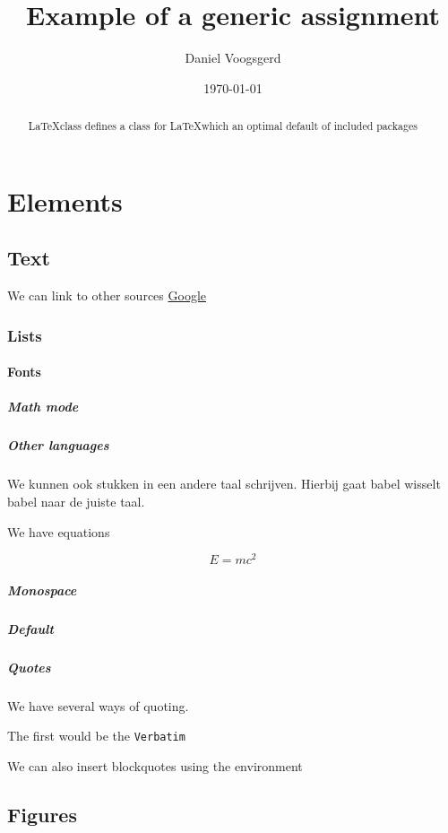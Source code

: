 \documentclass{uniarticle}
\title{Example of a generic assignment}
\date{\today}
\author{Daniel Voogsgerd}
\begin{document}
\maketitle

\tableofcontents

\begin{abstract}
    \LaTeX class defines a class for \LaTeX which an optimal default of
    included packages
\end{abstract}

\section{Elements}

\subsection{Text}

We can link to other sources \href{https://google.com}{Google}

\subsubsection{Lists}

\paragraph{Fonts}

\subparagraph{Math mode}

\subparagraph{Other languages}

\foreignlanguage{dutch}{
    We kunnen ook stukken in een andere taal schrijven. Hierbij gaat babel
    wisselt babel naar de juiste taal.
}

We have equations

\begin{equation}
    E = mc^2
\end{equation}

\subparagraph{Monospace}

\subparagraph{Default}

\subparagraph{Quotes}

We have several ways of quoting.

The first would be the \verb|Verbatim|

We can also insert blockquotes using the environment

\subsection{Figures}
\end{document}
